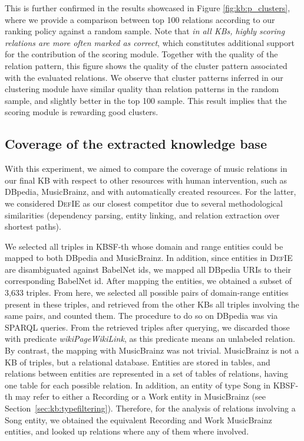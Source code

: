 This is further confirmed in the results showcased in Figure \ref{fig:kb:p_clusters}, where we provide a comparison between top 100 relations according to our ranking policy against a random sample. Note that \textit{in all KBs, highly scoring relations are more often marked as correct}, which constitutes additional support for the contribution of the scoring module. Together with the quality of the relation pattern, this figure shows the quality of the cluster pattern associated with the evaluated relations. We observe that cluster patterns inferred in our clustering module have similar quality than relation patterns in the random sample, and slightly better in the top 100 sample. This result implies that the scoring module is rewarding good clusters.

\subsection{Coverage of the extracted knowledge base}
\label{sec:kb:experiments:coverage}

With this experiment, we aimed to compare the coverage of music relations in our final KB with respect to other resources with human intervention, such as DBpedia, MusicBrainz, and with automatically created resources. For the latter, we considered \textsc{DefIE} \citep{DelliBovietal2015b} as our closest competitor due to several methodological similarities (dependency parsing, entity linking, and relation extraction over shortest paths). 

We selected all triples in \textsc{KBSF}-th whose domain and range entities could be mapped to both DBpedia and MusicBrainz. %
In addition, since entities in \textsc{DefIE} are disambiguated against BabelNet ids, we mapped all DBpedia URIs to their corresponding BabelNet id. After mapping the entities, we obtained a subset of 3,633 triples. From here, we selected all possible pairs of domain-range entities present in these triples, and retrieved from the other KBs all triples involving the same pairs, and counted them.
The procedure to do so on DBpedia was via SPARQL queries.
From the retrieved triples after querying, we discarded those with predicate \textit{wikiPageWikiLink}, as this predicate means an unlabeled relation. By contrast, the mapping with MusicBrainz was not trivial. MusicBrainz is not a KB of triples, but a relational database. Entities are stored in tables, and relations between entities are represented in a set of tables of relations, having one table for each possible relation. %
In addition, an entity of type Song in \textsc{KBSF}-th may refer to either a Recording or a Work entity in MusicBrainz (see Section~\ref{sec:kb:typefiltering}). Therefore, for the analysis of relations involving a Song entity, we obtained the equivalent Recording and Work MusicBrainz entities, and looked up relations where any of them where involved.

